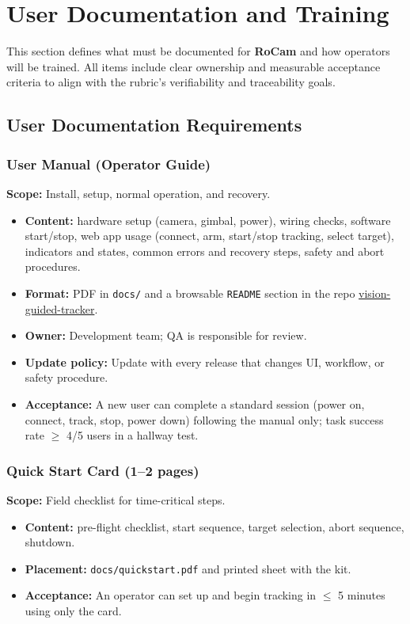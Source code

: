 \documentclass[12pt]{article}
\begin{document}

\section{User Documentation and Training}
\label{sec:user-docs-training}

This section defines what must be documented for \textbf{RoCam} and how
operators will be trained. All items include clear ownership and measurable
acceptance criteria to align with the rubric’s verifiability and traceability
goals.

\subsection{User Documentation Requirements}
\label{subsec:user-docs-reqs}

\subsubsection{User Manual (Operator Guide)}
\textbf{Scope:} Install, setup, normal operation, and recovery.
\begin{itemize}
  \item \textbf{Content:} hardware setup (camera, gimbal, power), wiring checks, software start/stop, web app usage (connect, arm, start/stop tracking, select target), indicators and states, common errors and recovery steps, safety and abort procedures.
  \item \textbf{Format:} PDF in \texttt{docs/} and a browsable \texttt{README} section in the repo \href{https://github.com/ZifanSi/vision-guided-tracker}{vision-guided-tracker}.
  \item \textbf{Owner:} Development team; QA is responsible for review.
  \item \textbf{Update policy:} Update with every release that changes UI, workflow, or safety procedure.
  \item \textbf{Acceptance:} A new user can complete a standard session (power on, connect, track, stop, power down) following the manual only; task success rate $\geq$ 4/5 users in a hallway test.
\end{itemize}

\subsubsection{Quick Start Card (1–2 pages)}
\textbf{Scope:} Field checklist for time-critical steps.
\begin{itemize}
  \item \textbf{Content:} pre-flight checklist, start sequence, target selection, abort sequence, shutdown.
  \item \textbf{Placement:} \texttt{docs/quickstart.pdf} and printed sheet with the kit.
  \item \textbf{Acceptance:} An operator can set up and begin tracking in $\leq$ 5 minutes using only the card.
\end{itemize}
\end{document}
